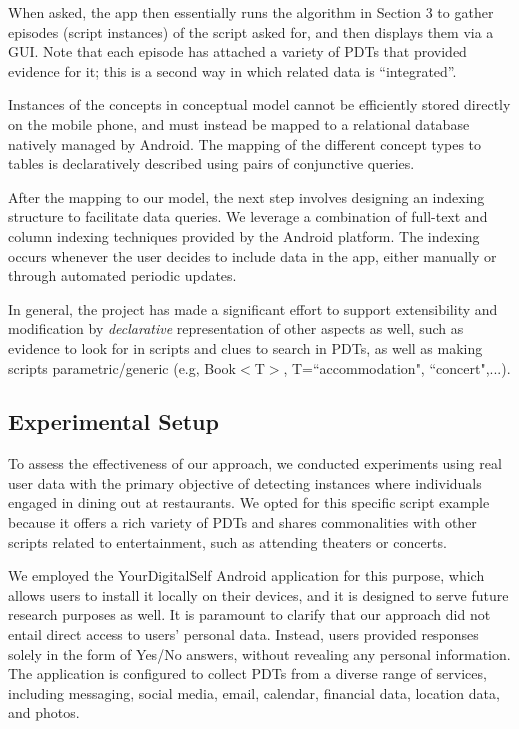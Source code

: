 \documentclass[11pt]{article}
\begin{document}

When asked, the app then essentially runs the algorithm in Section 3 to
 gather episodes (script instances) of the script asked for, and then
 displays them via a GUI. Note that each episode has attached a variety of PDTs that provided evidence for it; this is a second way in which related data is ``integrated''.

Instances of the concepts in  conceptual model  cannot be efficiently
 stored directly on the mobile phone, and must instead be mapped to a
relational database natively managed by Android. The mapping of the
different concept types to tables is declaratively described using
pairs of conjunctive queries.

After the mapping to our model, the next step involves
designing an indexing structure to facilitate data queries. We
leverage a combination of full-text and column indexing techniques
provided by the Android platform. The indexing occurs whenever the
user decides to include data in the app, either manually or through
automated periodic updates.


In general, the project has made a significant effort to support
extensibility and modification by {\em declarative} representation
of other aspects as well, such as evidence to look for in scripts and clues to
search in PDTs, as well as making scripts parametric/generic (e.g,
Book$<$T$>$, T=``accommodation", ``concert",...).


\subsection{Experimental Setup}

To assess the effectiveness of our approach, we conducted experiments using real user data with the primary objective of detecting instances where individuals engaged in dining out at restaurants. We opted for this specific script example because it offers a rich variety of PDTs and shares commonalities with other scripts related to entertainment, such as attending theaters or concerts. 

We employed the YourDigitalSelf Android application for this purpose, which allows users to install it locally on their devices, and it is designed to serve future research purposes as well. It is paramount to clarify that our approach did not entail direct access to users' personal data. Instead, users provided responses solely in the form of Yes/No answers, without revealing any personal information. The application is configured to collect PDTs from a diverse range of services, including messaging, social media, email, calendar, financial data, location data, and photos.
\end{document}

